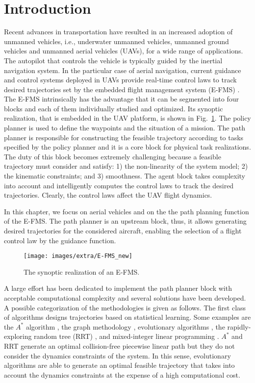 \section{Introduction}
\label{subsec:rst_introduction}
Recent advances in transportation have resulted in an increased adoption of unmanned vehicles, i.e., underwater unmanned vehicles, unmanned ground vehicles and unmanned aerial vehicles (UAVs), for a wide range of applications. The autopilot that controls the vehicle is typically guided by the inertial navigation system. In the particular case of aerial navigation, current guidance and control systems deployed in UAVs provide real-time control laws to track desired trajectories set by the embedded flight management system (E-FMS) \cite{spitzer2000digital}. The E-FMS intrinsically has the advantage that it can be segmented into four blocks and each of them individually studied and optimized. Its synoptic realization, that is embedded in the UAV platform, is shown in Fig.~\ref{fig:rst_E-FMS}. The policy planner is used to define the waypoints and the situation of a mission. The path planner is responsible for constructing the feasible trajectory according to tasks specified by the policy planner and it is a core block for physical task realizations. The duty of this block becomes extremely challenging because a feasible trajectory must consider and satisfy: 1) the non-linearity of the system model; 2) the kinematic constraints; and 3) smoothness. The agent block takes complexity into account and intelligently computes the control laws to track the desired trajectories. Clearly, the control laws affect the UAV flight dynamics. \par
In this chapter, we focus on aerial vehicles and on the the path planning function of the E-FMS.
The path planner is an upstream block, thus, it allows generating desired trajectories for the considered aircraft, enabling the selection of a flight control law by the guidance function.
\begin{figure}[t]
\texttt{[image: images/extra/E-FMS\_new]}
\centering
\caption{The synoptic realization of an E-FMS.}
\label{fig:rst_E-FMS}
\end{figure}

A large effort has been dedicated to implement the path planner block with acceptable computational complexity and several solutions have been developed. A possible categorization of the methodologies is given as follows. The first class of algorithms designs trajectories based on statistical learning. Some examples are the $A^{\ast}$ algorithm \cite{DeFilippis2012}, the graph methodology \cite{1206461}, evolutionary algorithms \cite{richter2016polynomial}, the rapidly-exploring random tree (RRT) \cite{5175292}, and mixed-integer linear programming \cite{5446292}. $A^{\ast}$ and RRT generate an optimal collision-free piecewise linear path but they do not consider the dynamics constraints of the system. In this sense, evolutionary algorithms are able to generate an optimal feasible trajectory that takes into account the dynamics constraints at the expense of a high computational cost.

